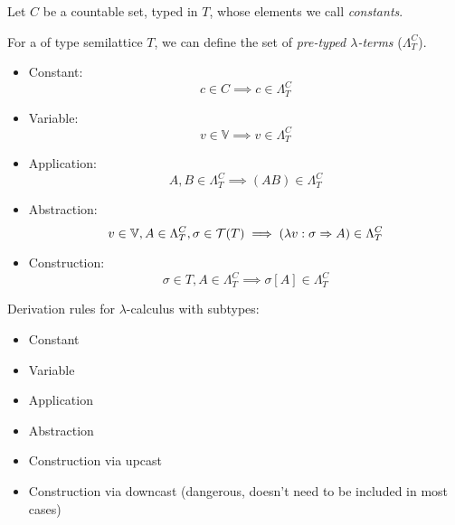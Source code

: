 \documentclass[main.tex]{subfiles}
\begin{document}
\begin{defn}
    Let $C$ be a countable set, typed in $T$,
    whose elements we call \emph{constants}.

    For a of type semilattice $T$, we can define the set of
    \emph{pre-typed $\lambda$-terms} ($\Lambda_T^C$).

    \begin{itemize}
        \item Constant:    \[ c \in C \implies c \in \Lambda_T^C \]
        \item Variable:    \[ v \in \mathbb{V} \implies v \in \Lambda_T^C \]
        \item Application: \[ A, B \in \Lambda_T^C \implies (AB) \in \Lambda_T^C \]
        \item Abstraction: \[ v \in \mathbb{V}, A \in \Lambda_T^C, \sigma \in \mathcal{T}( T )
                \implies (\lambda v : \sigma \Rightarrow A) \in \Lambda_T^C \]
        \item Construction: \[ \sigma \in T, A \in \Lambda_T^C
                \implies \sigma[A] \in \Lambda_T^C \]
    \end{itemize}
\end{defn}

\begin{defn}
    Derivation rules for $\lambda$-calculus with subtypes:

    \begin{itemize}
        \item Constant
        \item Variable
        \item Application
        \item Abstraction
        \item Construction via upcast
        \item Construction via downcast (dangerous, doesn't need to be included in most cases)
    \end{itemize}
\end{defn}
\end{document}
